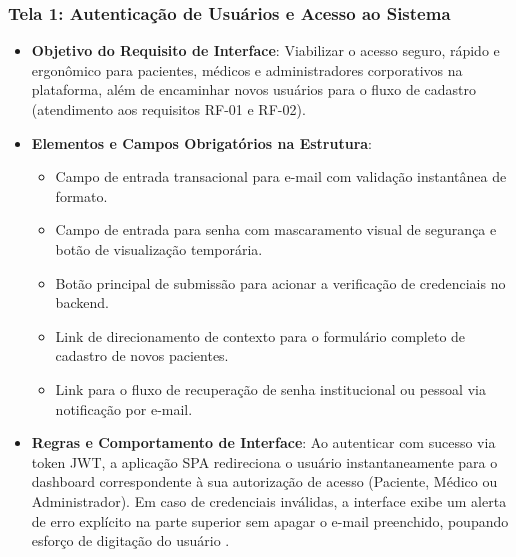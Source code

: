 \subsubsection{Tela 1: Autenticação de Usuários e Acesso ao Sistema}
\begin{itemize}
    \item \textbf{Objetivo do Requisito de Interface}: Viabilizar o acesso seguro, rápido e ergonômico para pacientes, médicos e administradores corporativos na plataforma, além de encaminhar novos usuários para o fluxo de cadastro (atendimento aos requisitos RF-01 e RF-02).
    \item \textbf{Elementos e Campos Obrigatórios na Estrutura}:
    \begin{itemize}
        \item Campo de entrada transacional para e-mail com validação instantânea de formato.
        \item Campo de entrada para senha com mascaramento visual de segurança e botão de visualização temporária.
        \item Botão principal de submissão para acionar a verificação de credenciais no backend.
        \item Link de direcionamento de contexto para o formulário completo de cadastro de novos pacientes.
        \item Link para o fluxo de recuperação de senha institucional ou pessoal via notificação por e-mail.
    \end{itemize}
    \item \textbf{Regras e Comportamento de Interface}: Ao autenticar com sucesso via token JWT, a aplicação SPA redireciona o usuário instantaneamente para o dashboard correspondente à sua autorização de acesso (Paciente, Médico ou Administrador). Em caso de credenciais inválidas, a interface exibe um alerta de erro explícito na parte superior sem apagar o e-mail preenchido, poupando esforço de digitação do usuário \cite{nielsen1993}.
\end{itemize}

